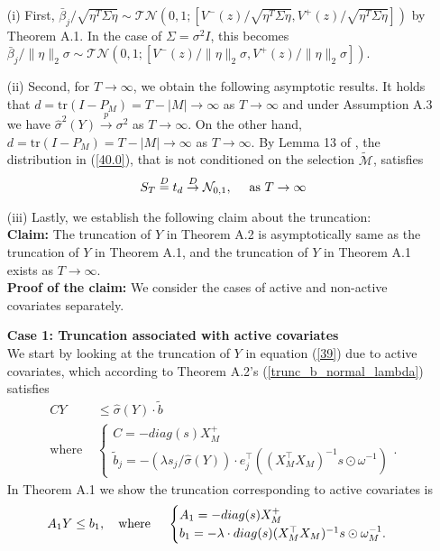 \documentclass[11pt]{article}
\newcommand{\q}{\text{\quad}}
\newcommand{\wh}{\text{where }}
\newcommand{\tr}{\mathrm{tr}}
\newcommand{\CD}{\stackrel{D}{\rightarrow}}
\newcommand{\CP}{\stackrel{p}{\rightarrow}}
\begin{document}
	\begin{enumerate}
		\item[(i)] First, $\bar{\beta}_j/\sqrt{\eta^T\Sigma\eta}\sim \mathcal{TN}(0,1;[V^{-}(z)/\sqrt{\eta^T\Sigma\eta},V^{+}(z)/\sqrt{\eta^T\Sigma\eta}])$ by Theorem A.1. In the case of $\Sigma=\sigma^2 I$, this becomes $\bar{\beta}_j/\|\eta\|_2\sigma \sim \mathcal{TN}(0,1;[V^{-}(z)/\|\eta\|_2\sigma,V^{+}(z)/\|\eta\|_2\sigma])$.
		
		\item[(ii)] Second, for $T\to\infty$, we obtain the following asymptotic results. It holds that $d=\tr(I-P_M)=T-|M|\to\infty$ as $T\to\infty$ and under Assumption A.3 we have $\hat{\sigma}^2(Y)\CP\sigma^2$ as $T\to\infty$. On the other hand, $d=\tr(I-P_M)=T-|M|\to\infty$ as $T\to\infty$. By Lemma 13 of \cite{10.1214/13-EJS815}, the distribution in (\ref{40.0}), that is not conditioned on the selection $\tilde{\mathcal{M}}$, satisfies 
		\begin{equation}\label{56}
			S_T\stackrel{D}{=} t_d\CD\mathcal{N}_{0,1},\q \text{ as }T\to\infty
		\end{equation}		
		\item[(iii)] Lastly, we establish the following claim about the truncation:\\		
		\textbf{Claim:} The truncation of $Y$ in Theorem A.2 is asymptotically same as the truncation of $Y$ in Theorem A.1, and the truncation of $Y$ in Theorem A.1 exists as $T\to\infty$.\\
		\textbf{Proof of the claim:} We consider the cases of active and non-active covariates separately.
		
		\textbf{Case 1: Truncation associated with active covariates}\\
		We start by looking at the truncation of $Y$ in equation (\ref{39}) due to active covariates, which according to Theorem A.2's (\ref{trunc_b_normal_lambda}) satisfies
		\begin{equation}\label{62}
			\begin{split}
				C Y&\leq \hat{\sigma}(Y)\cdot  \tilde{b}\\\wh&
				\begin{cases}
					C=-diag(s) X_M^+\\
										\tilde{b}_j=- (\lambda s_j/\hat{\sigma}(Y) )\cdot  e_j^\top \left((X_M^\top X_M)^{-1}s\odot \omega^{-1}\right)
				\end{cases}.
			\end{split}
		\end{equation}
		In Theorem A.1 we show the truncation corresponding to active covariates is
		\begin{equation}\label{63}
			\begin{split}
				A_1
				Y\leq b_1,\q\wh\q\begin{cases}
					A_1=-diag(s)X_M^+
					\\
					b_1=-\lambda \cdot diag(s)(X_M^\top X_M)^{-1}s\odot\omega^{-1}_M.
				\end{cases}
			\end{split}
		\end{equation}


\end{enumerate}
\end{document}
